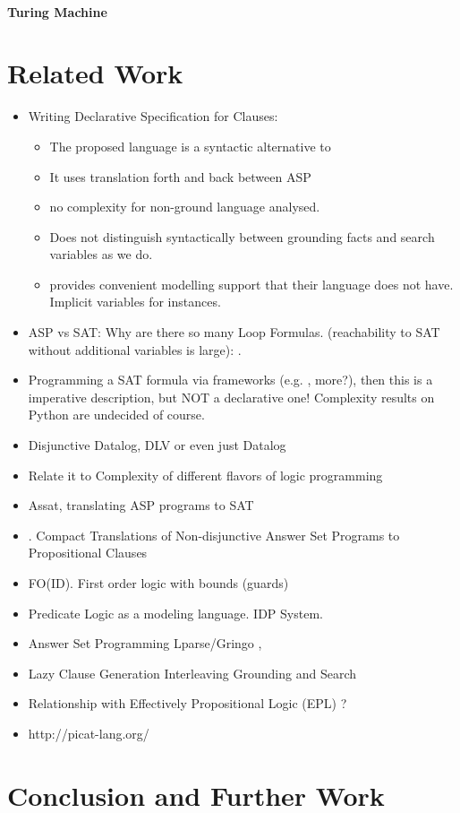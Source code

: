 \documentclass[runningheads]{llncs}
\begin{document}
\paragraph{Turing Machine}

\section{Related Work}
 \begin{itemize}
     \item Writing Declarative Specification for Clauses: \cite{Gebser16} 
         \begin{itemize}
             \item The proposed language is a syntactic alternative to \bcore
             \item It uses translation forth and back between ASP
             \item no complexity for non-ground language analysed. 
             \item Does not distinguish syntactically between grounding facts and search variables as we do. 
             \item \bnice provides convenient modelling support that their language does not have. Implicit variables for instances. 
         \end{itemize}
     \item ASP vs SAT: Why are there so many Loop Formulas. (reachability to SAT without additional variables is large): \cite{Lifschitz04} .
     \item Programming a SAT formula via frameworks (e.g. \cite{Pysat18},
         more?), then this is a imperative description, but NOT a declarative
         one! Complexity results on Python are undecided of course. 
     \item Disjunctive Datalog, DLV \cite{Eiter97} or even just Datalog \cite{Gottlob89}
     \item Relate it to Complexity of different flavors of logic programming \cite{Gottlob01}
     \item Assat, translating ASP programs to SAT \cite{Lin04}
     \item \cite{Janhunen11}. Compact Translations of Non-disjunctive Answer Set
         Programs to Propositional Clauses
     \item FO(ID). First order logic with bounds (guards) \cite{Wittocx10}
     \item Predicate Logic as a modeling language. IDP System. \cite{Cat18}
     \item Answer Set Programming Lparse/Gringo \cite{Gebser15}, \cite{Ferraris05}
     \item Lazy Clause Generation Interleaving Grounding and Search \cite{Cat15}
     \item Relationship with Effectively Propositional Logic (EPL) \cite{Moura08}? 
     \item http://picat-lang.org/
 \end{itemize}

\section{Conclusion and Further Work}



\end{document}
